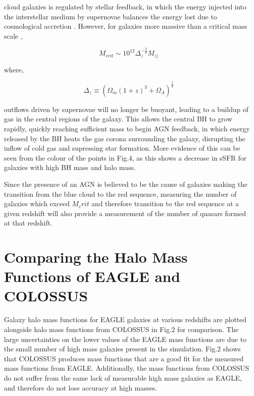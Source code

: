 \documentclass[12pt, twocolumn]{revtex4}    %
\begin{document}
\noindent cloud galaxies is regulated by  stellar feedback, in which the energy injected into the interstellar medium by supernovae balances the energy lost due to cosmological accretion \cite{Ikea}. However, for galaxies more massive than a critical mass scale \cite{Quasar},

\begin{equation}
    M_{crit}\sim10^{12}\Delta_{z}^{-\frac{3}{8}}M_\odot
\end{equation}

\noindent where,

\begin{equation}
    \Delta_z\equiv(\Omega_m(1+z)^3+\Omega_\Lambda)^{\frac{1}{3}}
\end{equation}

\noindent outflows driven by supernovae will no longer be buoyant, leading to a buildup of gas in the central regions of the galaxy. This allows the central BH to grow rapidly, quickly reaching sufficient mass to begin AGN feedback, in which energy released by the BH heats the gas corona surrounding the galaxy, disrupting the inflow of cold gas and supressing star formation. More evidence of this can be seen from the colour of the points in Fig.4, as this shows a decrease in sSFR for galaxies with high BH mass and halo mass.\par

Since the presence of an AGN is believed to be the cause of galaxies making the transition from the blue cloud to the red sequence, measuring the number of galaxies which exceed $M_crit$ and therefore transition to the red sequence at a given redshift will also provide a measurement of the number of quasars formed at that redshift.

\section{Comparing the Halo Mass Functions of EAGLE and COLOSSUS}

Galaxy halo mass functions for EAGLE galaxies at various redshifts are plotted alongside halo mass functions from COLOSSUS in Fig.2 for comparison. The large uncertainties on the lower values of the EAGLE mass functions are due to the small number of high mass galaxies present in the simulation. Fig.2 shows that COLOSSUS produces mass functions that are a good fit for the measured mass functions from EAGLE. Additionally, the mass functions from COLOSSUS do not suffer from the same lack of measurable high mass galaxies as EAGLE, and therefore do not lose accuracy at high masses.
\end{document}
